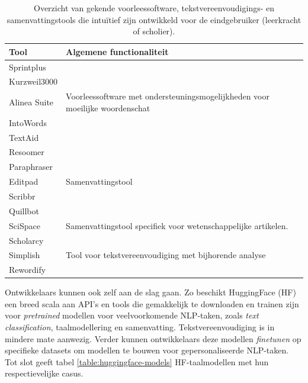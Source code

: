 \begin{center}
	\begin{table}[H]
		\begin{tabular}{ | m{4cm} | m{11cm} | } 
		\hline
		\textbf{Tool} & \textbf{Algemene functionaliteit} \\
		\hline
		Sprintplus & \\
		Kurzweil3000 & \\
		Alinea Suite & Voorleessoftware met ondersteuningsmogelijkheden voor moeilijke woordenschat \\
		IntoWords & \\
		TextAid & \\
		\hline
		Resoomer &  \\
		Paraphraser & \\
		Editpad & Samenvattingstool \\
		Scribbr & \\
		Quillbot & \\
		\hline
		SciSpace & Samenvattingstool specifiek voor wetenschappelijke artikelen. \\
		Scholarcy & \\
		\hline
		Simplish & Tool voor tekstvereenvoudiging met bijhorende analyse\\
		Rewordify & \\
		\hline
		\end{tabular}
	\caption{Overzicht van gekende voorleessoftware, tekstvereenvoudigings- en samenvattingstools die intuïtief zijn ontwikkeld voor de eindgebruiker (leerkracht of scholier).}
	\label{table:overview-tools}
	\end{table}
\end{center}

\medspace

Ontwikkelaars kunnen ook zelf aan de slag gaan. Zo beschikt HuggingFace (HF) een breed scala aan API's en tools die gemakkelijk te downloaden en trainen zijn voor \textit{pretrained} modellen voor veelvoorkomende NLP-taken, zoals \textit{text classification}, taalmodellering en samenvatting. Tekstvereenvoudiging is in mindere mate aanwezig. Verder kunnen ontwikkelaars deze modellen \textit{finetunen} op specifieke datasets om modellen te bouwen voor gepersonaliseerde NLP-taken. Tot slot geeft tabel \ref{table:huggingface-models} HF-taalmodellen met hun respectievelijke casus.

\medspace

